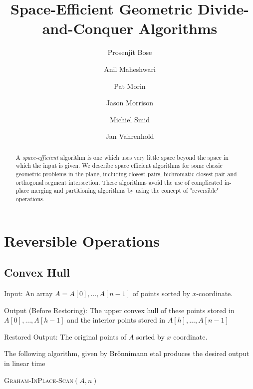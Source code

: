 \documentclass{patmorin}
\title{Space-Efficient Geometric Divide-and-Conquer Algorithms}
\author{Prosenjit Bose \and
	Anil Maheshwari \and
	Pat Morin \and
	Jason Morrison \and
	Michiel Smid \and
	Jan Vahrenhold}
\date{}
\newcommand{\rt}{\mathrm{right\_turn}}
\begin{document}
\maketitle

\begin{abstract}
A \emph{space-efficient} algorithm is one which uses very little space
beyond the space in which the input is given.  We describe space
efficient algorithms for some classic geometric problems in the plane,
including closest-pairs, bichromatic closest-pair and orthogonal segment
intersection.  These algorithms avoid the use of complicated in-place
merging and partitioning algorithms by using the concept of
"reversible" operations.
\end{abstract}

\section{Reversible Operations}

\subsection{Convex Hull}

\begin{description}
\item{Input:} An array $A=A[0],\ldots,A[n-1]$ of points sorted by
$x$-coordinate.

\item{Output (Before Restoring):} The upper convex hull of these
points stored in $A[0],\ldots,A[h-1]$ and the interior points stored in
$A[h],\ldots,A[n-1]$ 

\item{Restored Output:} The original points of $A$ sorted by $x$
coordinate.
\end{description}

The following algorithm, given by Br\"onnimann etal produces the
desired output in linear time

\vspace{1ex}
\noindent\begin{minipage}{\textwidth}
\textsc{Graham-InPlace-Scan}$(A, n)$
\begin{algorithmic}[1]
  \WHILE{$h\ge 2$ \textbf{and} \textbf{not} $\rt(S[h-2], S[h-1], S[i])$}
  \ENDWHILE
\ENDFOR
{}
\end{algorithmic}
\end{minipage}
\vspace{1ex}
 
\end{document}
